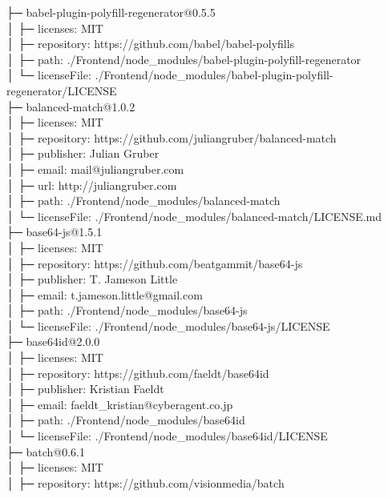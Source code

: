 \documentclass[
    paper=a4,
    twoside=false,
    parskip=half,
    listof=entryprefix,
    listof=totoc,
    index=totoc,
    bibliography=totoc,
    headsepline,
]{scrbook}
\begin{document}
    ├─ babel-plugin-polyfill-regenerator@0.5.5\\
    │  ├─ licenses: MIT\\
    │  ├─ repository: https://github.com/babel/babel-polyfills\\
    │  ├─ path: ./Frontend/node\_modules/babel-plugin-polyfill-regenerator\\
    │  └─ licenseFile: ./Frontend/node\_modules/babel-plugin-polyfill-regenerator/LICENSE\\
    ├─ balanced-match@1.0.2\\
    │  ├─ licenses: MIT\\
    │  ├─ repository: https://github.com/juliangruber/balanced-match\\
    │  ├─ publisher: Julian Gruber\\
    │  ├─ email: mail@juliangruber.com\\
    │  ├─ url: http://juliangruber.com\\
    │  ├─ path: ./Frontend/node\_modules/balanced-match\\
    │  └─ licenseFile: ./Frontend/node\_modules/balanced-match/LICENSE.md\\
    ├─ base64-js@1.5.1\\
    │  ├─ licenses: MIT\\
    │  ├─ repository: https://github.com/beatgammit/base64-js\\
    │  ├─ publisher: T. Jameson Little\\
    │  ├─ email: t.jameson.little@gmail.com\\
    │  ├─ path: ./Frontend/node\_modules/base64-js\\
    │  └─ licenseFile: ./Frontend/node\_modules/base64-js/LICENSE\\
    ├─ base64id@2.0.0\\
    │  ├─ licenses: MIT\\
    │  ├─ repository: https://github.com/faeldt/base64id\\
    │  ├─ publisher: Kristian Faeldt\\
    │  ├─ email: faeldt\_kristian@cyberagent.co.jp\\
    │  ├─ path: ./Frontend/node\_modules/base64id\\
    │  └─ licenseFile: ./Frontend/node\_modules/base64id/LICENSE\\
    ├─ batch@0.6.1\\
    │  ├─ licenses: MIT\\
    │  ├─ repository: https://github.com/visionmedia/batch\\
\end{document}
